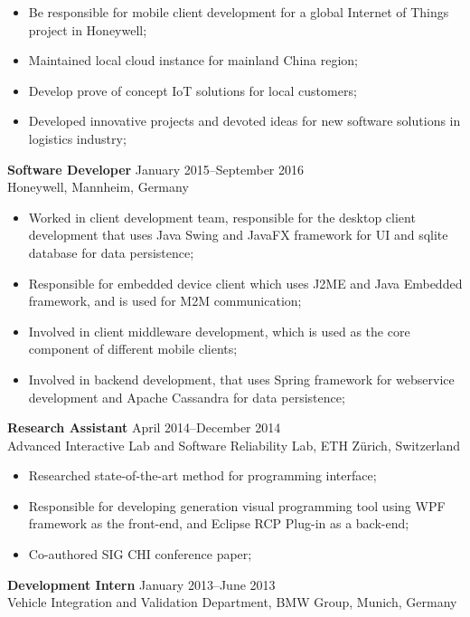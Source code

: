 \documentclass[margin, 10pt]{res} %
\begin{document}
\begin{resume}
\begin{CJK}{UTF8}{gbsn}
\begin{itemize} \itemsep -2pt %
\item Be responsible for mobile client development for a global Internet of Things project in Honeywell;
\item Maintained local cloud instance for mainland China region;
\item Develop prove of concept IoT solutions for local customers;
\item Developed innovative projects and devoted ideas for new software solutions in logistics industry;
\end{itemize}

\textbf{Software Developer} \hfill January 2015–September 2016 \\
Honeywell, Mannheim, Germany 

\begin{itemize} \itemsep -2pt %
\item Worked in client development team, responsible for the desktop client development that uses Java Swing and JavaFX framework for UI and sqlite database for data persistence;
\item Responsible for embedded device client which uses J2ME and Java Embedded framework, and is used for M2M communication;
\item Involved in client middleware development, which is used as the core component of different mobile clients;
\item Involved in backend development, that uses Spring framework for webservice development and Apache Cassandra for data persistence;
\end{itemize}

\textbf{Research Assistant} \hfill April 2014–December 2014 \\
Advanced Interactive Lab and Software Reliability Lab, ETH Zürich, Switzerland 

\begin{itemize} \itemsep -2pt %
\item Researched state-of-the-art method for programming interface;
\item Responsible for developing generation visual programming tool using WPF framework as the front-end, and Eclipse RCP Plug-in as a back-end;
\item Co-authored SIG CHI conference paper;
\end{itemize}

\textbf{Development Intern} \hfill January 2013–June 2013 \\
Vehicle Integration and Validation Department, BMW Group, Munich, Germany 


\end{CJK}
\end{resume}
\end{document}
